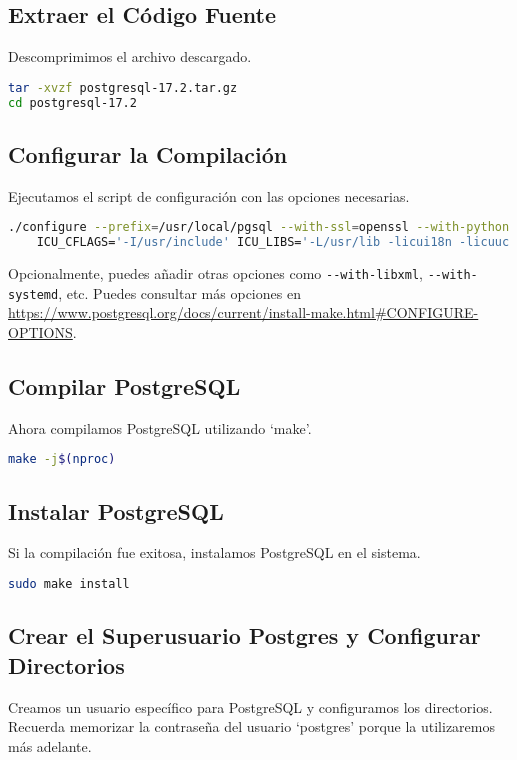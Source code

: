 \documentclass{article}
\begin{document}
\subsection{Extraer el Código Fuente}
Descomprimimos el archivo descargado.

\begin{lstlisting}[language=bash]
tar -xvzf postgresql-17.2.tar.gz
cd postgresql-17.2
\end{lstlisting}

\subsection{Configurar la Compilación}
Ejecutamos el script de configuración con las opciones necesarias.

\begin{lstlisting}[language=bash]
./configure --prefix=/usr/local/pgsql --with-ssl=openssl --with-python --with-perl \
    ICU_CFLAGS='-I/usr/include' ICU_LIBS='-L/usr/lib -licui18n -licuuc -licudata'
\end{lstlisting}
Opcionalmente, puedes añadir otras opciones como \lstinline{--with-libxml}, \lstinline{--with-systemd}, etc.  Puedes consultar más opciones en \url{https://www.postgresql.org/docs/current/install-make.html#CONFIGURE-OPTIONS}.

\subsection{Compilar PostgreSQL}
Ahora compilamos PostgreSQL utilizando `make'.

\begin{lstlisting}[language=bash]
make -j$(nproc)
\end{lstlisting}

\subsection{Instalar PostgreSQL}
Si la compilación fue exitosa, instalamos PostgreSQL en el sistema.

\begin{lstlisting}[language=bash]
sudo make install
\end{lstlisting}

\subsection{Crear el Superusuario Postgres y Configurar Directorios}
Creamos un usuario específico para PostgreSQL y configuramos los directorios.  Recuerda memorizar la contraseña del usuario `postgres' porque la utilizaremos más adelante.
\end{document}
